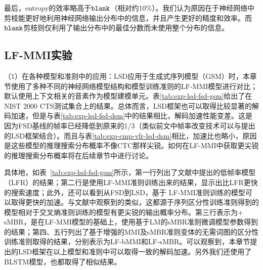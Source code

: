 最后，entropy的效率略高于$\tt blank$（相对约10\%）。我们认为原因在于神经网络中剪枝能更好地利用神经网络输出分布中的信息，并且产生更好的精度和效率。而$\tt blank$剪枝则仅利用了输出分布中的最佳分数而未使用整个分布的信息。

\subsection{LF-MMI实验}
\label{exp:gsm}
（1）在各种模型和准则中的应用：LSD应用于生成式序列模型（GSM）时，本章节使用了多种不同的神经网络模型结构和模型训练准则的LF-MMI模型进行对比；默认使用上下文相关的音素作为模型建模单元。表\ref{tab:exp-lsd-fsd-gsm}给出了在NIST 2000 CTS测试集合上的结果。总体而言，LSD框架也可以取得比较显著的解码加速，但是与表\ref{tab:exp-lsd-fsd-dsm}中的结果相比，解码加速性能变差。这是因为FSD基线的帧率已经降低到原来的1/3\cite{pundak2016lower}（类似前文中帧率改变技术可以与提出的LSD框架结合）。而且与表\ref{tab:exp-cmp-vfr-lsd-dsm}相比，加速比也略小，原因是这些模型的推理搜索分布概率不像CTC那样尖锐。如何在LF-MMI中获取更尖锐的推理搜索分布概率将在后续章节中进行讨论。

具体地，如表~\ref{tab:exp-lsd-fsd-gsm}所示，第一行列出了文献\cite{pundak2016lower}中提出的低帧率模型（LFR）的结果；第二行是使用LF-MMI准则\cite{povey2016purely}训练出来的结果，显示出比LFR更快的搜索速度；此外，还可以看到从FSD到LSD，基于 LF-MMI准则训练的模型可以取得更快的加速。与文献\cite{paulik2015improvements}中观察到的类似，这都源于序列区分性训练准则得到的模型相对于交叉熵准则训练的模型有更尖锐的输出概率分布。第三行表示为+ sMBR，是在LF-MMI模型的基础上，使用基于LM的sMBR准则微调模型参数得到的结果；第四、五行列出了基于增强的MMI\cite{povey2008boosted}及sMBR准则变体的无需词图的区分性训练准则取得的结果，分别表示为LF-bMMI和LF-sMBR。可以观察到，本章节提出的LSD框架在以上模型和准则中可以取得一致的解码加速。另外我们还使用了BLSTM模型，也都取得了相似结果。


